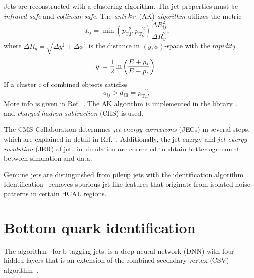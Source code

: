 Jets are reconstructed with a clustering algorithm.
The jet properties must be \emph{infrared safe} and \emph{collinear safe}.
The \emph{anti-$k_\text{T}$} (AK) \emph{algorithm} utilizes the metric
\begin{equation} \label{eq:antikT}
  d_{ij} = \min\left(p_\text{T,i}^{-2},p_\text{T,j}^{-2}\right)\frac{\Delta R^2_{ij}}{\Delta R_y^2},
\end{equation}
where $\Delta R_y=\sqrt{\Delta y^2+\Delta\phi^2}$ is the distance in $(y,\phi)$-space with the \emph{rapidity}
\begin{equation} \label{eq:rapidity}
  y \defeq \frac{1}{2}\ln\left(\frac{E+p_z}{E-p_z}\right).
\end{equation}
If a cluster $i$ of combined objects satisfies
\begin{equation} \label{eq:antikT_cut}
  d_{ij} > d_{i\text{B}} = p_\text{T,i}^{-2},
\end{equation}
More info is given in Ref.~\cite{PF2017,antikT}.
The AK algorithm is implemented in the \FASTJET library~\cite{fastjet1,fastjet2}, and \emph{charged-hadron subtraction} (CHS) is used.

The CMS Collaboration determines \emph{jet energy corrections} (JECs) in several steps, which are explained in detail in Ref.~\cite{CMS-JME-10-011}.
Additionally, the jet energy and \emph{jet energy resolution} (JER) of jets in simulation are corrected to obtain better agreement between simulation and data.

Genuine jets are distinguished from pileup jets with the identification algorithm~\cite{jetPUID}.
Identification~\cite{jetID_2016} removes spurious jet-like features that originate from isolated noise patterns in certain HCAL regions.


\section{Bottom quark identification} \label{sec:btagging}



The \DeepCSV algorithm~\cite{btag_deepCSV,btag_2018} for b tagging jets. \DeepCSV is a deep neural network (DNN) with four hidden layers that is an extension of the combined secondary vertex (CSV) algorithm~\cite{btag_deepCSV,btag_2018}.


